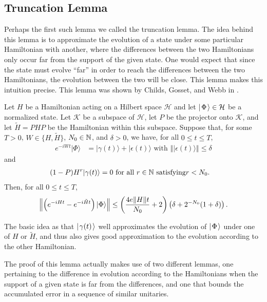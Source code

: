 \documentclass[../thesis-main/thesis-main]{subfiles}
\begin{document}
\subsection{Truncation Lemma}

Perhaps the first such lemma we called the truncation lemma.  The idea behind this lemma is to approximate the evolution of a state under some particular Hamiltonian with another, where the differences between the two Hamiltonians only occur far from the support of the given state.  One would expect that since the state must evolve ``far'' in order to reach the differences between the two Hamiltonians, the evolution between the two will be close.  This lemma makes this intuition precise.  This lemma was shown by Childs, Gosset, and Webb in \cite{MPQW}.

\begin{lemma}
\label{lem:truncation}
Let $H$ be a Hamiltonian acting on a Hilbert space $\mathcal{H}$ and let $|\mspace{2mu} \Phi \mspace{2mu} \rangle\in\mathcal{H}$ be a normalized state. Let
$\mathcal{K}$ be a subspace of $\mathcal{H}$, let $P$ be the projector onto $\mathcal{K}$,
and let $\tilde{H}=PHP$ be the Hamiltonian within this subspace. Suppose
that, for some $T>0$, $W\in\{H,\tilde{H}\}$, $N_0\in\mathbb{N}$,
and $\delta>0$, we have, for all $0\leq t\leq T$, 
\begin{align}
e^{-iWt}|\Phi\rangle & = |\gamma(t)\rangle+|\epsilon(t)\rangle \text{ with }
\left\Vert |\epsilon(t)\rangle\right\Vert \leq \delta
\end{align}
and
\begin{align}
  (1-P) H^{r}|\gamma(t)\rangle & = 0 \text{ for all } r\in\mathbb{N} \text{ satisfying} r < N_0.
\end{align}
Then, for all $0\leq t \leq T$, 
\begin{align}
  \left\|{\left(e^{-iHt}-e^{-i\tilde{H}t}\right)|\Phi\rangle}\right\|
  \leq \left(\frac{4e\|{H}\|t}{N_0} + 2 \right) 
        \left(\delta + 2^{-N_0}(1+\delta)\right).
\end{align}
\end{lemma}

The basic idea as that $|\mspace{2mu} \gamma(t) \mspace{2mu} \rangle$ well approximates the evolution of $|\mspace{2mu} \Phi \mspace{2mu} \rangle$ under one of $H$ or $\tilde{H}$, and thus also gives good approximation to the evolution according to the other Hamiltonian. 

The proof of this lemma actually makes use of two different lemmas, one pertaining to the difference in evolution according to the Hamiltonians when the support of a given state is far from the differences, and one that bounds the accumulated error in a sequence of similar unitaries.
\end{document}

